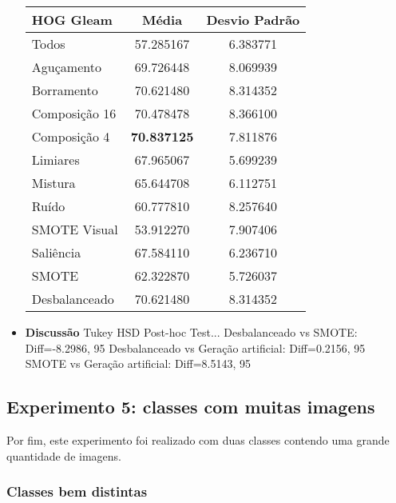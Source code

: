 \begin{itemize}
\begin{table}[!htbp]
\centering
\caption{}
\label{tab:resultados:4.2}
\begin{tabular}{|l|c|c|}
\hline
\textbf{HOG Gleam} & \textbf{Média}     & \textbf{Desvio Padrão} \\ \hline
   Todos        &  57.285167 &  6.383771  \\ \hline
  Aguçamento    &  69.726448 &  8.069939  \\ \hline
  Borramento    &  70.621480 &  8.314352  \\ \hline
  Composição 16 &  70.478478 &  8.366100  \\ \hline
  Composição 4  &  \textbf{70.837125} &  7.811876  \\ \hline
  Limiares      &  67.965067 &  5.699239  \\ \hline
  Mistura       &  65.644708 &  6.112751  \\ \hline
  Ruído         &  60.777810 &  8.257640  \\ \hline
  SMOTE Visual  &  53.912270 &  7.907406  \\ \hline
  Saliência     &  67.584110 &  6.236710  \\ \hline
 SMOTE          &  62.322870 &  5.726037  \\ \hline
Desbalanceado   &  70.621480 &  8.314352  \\ \hline
\end{tabular}
\end{table}

\item[] \textbf{Discussão}
Tukey HSD Post-hoc Test...
Desbalanceado vs SMOTE: Diff=-8.2986, 95%
Desbalanceado vs Geração artificial: Diff=0.2156, 95%
SMOTE vs Geração artificial: Diff=8.5143, 95%

\end{itemize}

\FloatBarrier
\subsection{Experimento 5: classes com muitas imagens}

Por fim, este experimento foi realizado com duas classes contendo uma grande quantidade de imagens.

\subsubsection{Classes bem distintas}

